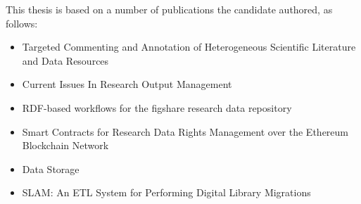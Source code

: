 This thesis is based on a number of publications the candidate authored, as follows:

\begin{itemize}
    \item Targeted Commenting and Annotation of Heterogeneous Scientific Literature and Data Resources
    \item Current Issues In Research Output Management
    \item RDF-based workflows for the figshare research data repository
    \item Smart Contracts for Research Data Rights Management over the Ethereum Blockchain Network
    \item Data Storage
    \item SLAM: An ETL System for Performing Digital Library Migrations
\end{itemize}